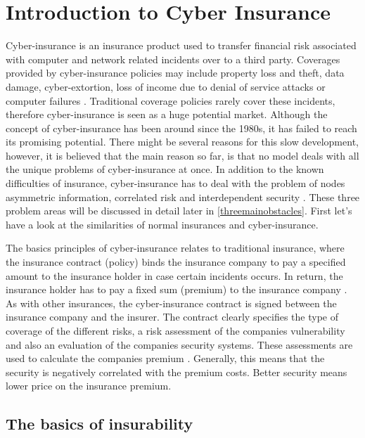 \chapter{Introduction to Cyber Insurance}
\label{chp:introductionToCyberInsurance} 


Cyber-insurance is an insurance product used to transfer financial risk
associated with computer and network related incidents over to a third party.
 Coverages provided by cyber-insurance policies may include property loss and
theft, data damage, cyber-extortion, loss of income due to denial of service attacks or computer failures \cite{washingtonpaper}.
Traditional coverage policies rarely cover these incidents, therefore cyber-insurance is seen as a huge potential market. Although the concept of cyber-insurance has been around since the 1980s, it has failed to reach its promising potential. There might be several reasons for this slow development, however, it is believed that the main reason so far, is that no model deals with all the unique problems of cyber-insurance at once. In addition to the known difficulties of insurance, cyber-insurance has to deal with the problem of nodes asymmetric information, correlated risk and interdependent security \cite{networkgames}. These three problem areas will be discussed in detail later in \ref{threemainobstacles}. First let's have a look at the similarities of normal insurances and cyber-insurance. 
  
The basics principles of cyber-insurance relates to traditional insurance, where the insurance contract (policy)
 binds the insurance company to pay a specified amount to the insurance holder in case certain incidents
  occurs. In return, the insurance holder has to pay a fixed sum (premium) to the insurance company
   \cite{robinson2012incentives}.
    As with other insurances, the cyber-insurance contract is signed between the insurance company and
     the insurer. The contract clearly specifies the type of coverage of the different risks, a risk
      assessment of the companies vulnerability and also an evaluation of the companies security
       systems. These assessments are used to calculate the companies premium \cite{robinson2012incentives}. Generally, this means that the security is negatively correlated with the premium costs. Better security means lower price on the insurance premium. 

\section{The basics of insurability}

